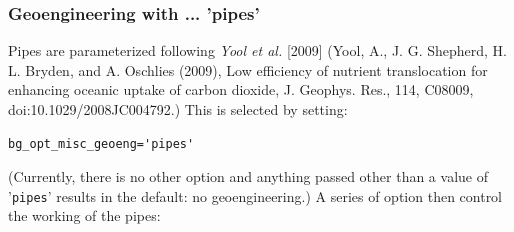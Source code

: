 \documentclass[11pt,fleqn]{book} %
\begin{document}
\subsubsection{Geoengineering with ... 'pipes'}

Pipes are parameterized following \textit{Yool et al.} [2009] (Yool, A., J. G. Shepherd, H. L. Bryden, and A. Oschlies (2009), Low efficiency of nutrient translocation for enhancing
oceanic uptake of carbon dioxide, J. Geophys. Res., 114, C08009, doi:10.1029/2008JC004792.) This is selected by setting:
\vspace{-1mm}\begin{verbatim}
bg_opt_misc_geoeng='pipes'
\end{verbatim}\vspace{-1mm}
(Currently, there is no other option and anything passed other than a value of '\texttt{pipes}' results in the default: no geoengineering.)
A series of option then control the working of the pipes:
\end{document}
